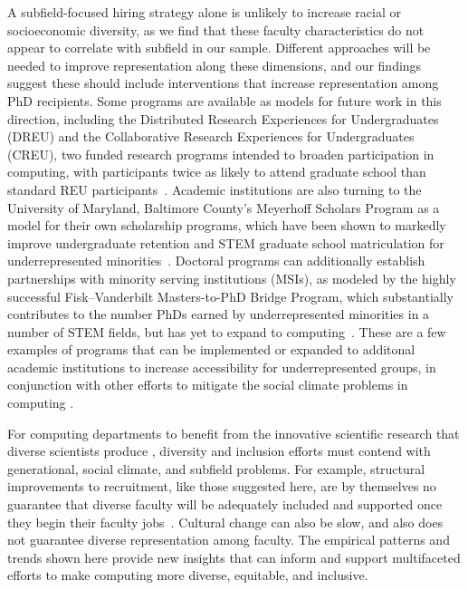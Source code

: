 \documentclass[reprint, twocolumn, aps, nofootinbib, superscriptaddress, longbibliography]{revtex4-1}
\begin{document}
A subfield-focused hiring strategy alone is unlikely to increase racial or socioeconomic diversity, as we find that these faculty characteristics do not appear to correlate with subfield in our sample. Different approaches will be needed to improve representation along these dimensions, and our findings suggest these should include interventions that increase representation among PhD recipients. Some programs are available as models for future work in this direction, including the Distributed Research Experiences for Undergraduates (DREU) and the Collaborative Research Experiences for Undergraduates (CREU), two funded research programs intended to broaden participation in computing, with participants twice as likely to attend graduate school than standard REU participants~\cite{tamer2016twice}. Academic institutions are also turning to the University of Maryland, Baltimore County's Meyerhoff Scholars Program as a model for their own scholarship programs, which have been shown to markedly improve undergraduate retention and STEM graduate school matriculation for underrepresented minorities~\cite{domingo2019replicating}. Doctoral programs can additionally establish partnerships with minority serving institutions (MSIs), as modeled by the highly successful Fisk–Vanderbilt Masters-to-PhD Bridge Program, which substantially contributes to the number PhDs earned by underrepresented minorities in a number of STEM fields, but has yet to expand to computing~\cite{powell2013higher, posselt2020equity}. These are a few examples of programs that can be implemented or expanded to additonal academic institutions to increase accessibility for underrepresented groups, in conjunction with other efforts to mitigate the social climate problems in computing \cite{liu2019patching, mcgee2020interrogating, casad2021gender, stout2014now}. 


For computing departments to benefit from the innovative scientific research that diverse scientists produce \cite{hofstra2020diversity}, diversity and inclusion efforts must contend with generational, social climate, and subfield problems. For example, structural improvements to recruitment, like those suggested here, are by themselves no guarantee that diverse faculty will be adequately included and supported once they begin their faculty jobs~\cite{tienda2013diversity, smith2017diversity, slay2019bait}. Cultural change can also be slow, and also does not guarantee diverse representation among faculty. The empirical patterns and trends shown here provide new insights that can inform and support multifaceted efforts to make computing more diverse, equitable, and inclusive. 
 
\end{document}
